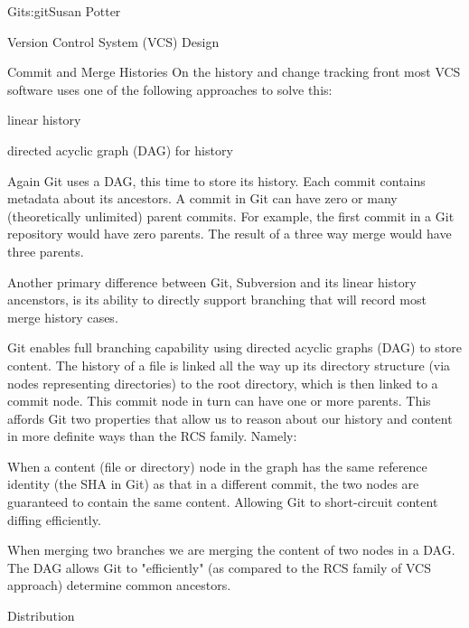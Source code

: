 \begin{aosachapter}{Git}{s:git}{Susan Potter}
\begin{aosasect1}{Version Control System (VCS) Design}
\begin{aosasect2}{Commit and Merge Histories}
On the history and change tracking front most VCS software uses one of
the following approaches to solve this:
\begin{aosaitemize}
  \item linear history
  \item directed acyclic graph (DAG) for history
\end{aosaitemize}

Again Git uses a DAG, this time to store its history. Each commit contains
metadata about its ancestors. A commit in Git can have zero or many
(theoretically unlimited) parent commits. For example, the first commit
in a Git repository would have zero parents. The result of a three way merge
would have three parents.

Another primary difference between Git, Subversion and its linear history
ancenstors, is its ability to directly support branching that will record
most merge history cases.


Git enables full branching capability using directed acyclic
graphs (DAG) to store content. The history of a file is linked all the way
up its directory structure (via nodes representing directories) to the root
directory, which is then linked to a commit node. This commit node in turn
can have one or more parents. This affords Git two
properties that allow us to reason about our history and content in
more definite ways than the RCS family. Namely:
\begin{aosaitemize}
  \item When a content (file or directory) node in the graph has the same
  reference identity (the SHA in Git) as that in a different commit, the two
  nodes are guaranteed to contain the same content. Allowing Git to
  short-circuit content diffing efficiently.
  \item When merging two branches we are merging the content of two nodes
  in a DAG. The DAG allows Git to "efficiently" (as compared to the
  RCS family of VCS approach) determine common ancestors.
\end{aosaitemize}

\end{aosasect2}
\begin{aosasect2}{Distribution}


\end{aosasect2}
\end{aosasect1}
\end{aosachapter}
